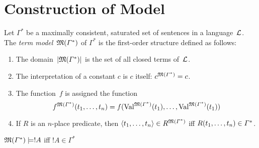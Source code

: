\documentclass[open-logic-section]{subfiles}
\begin{document}
\section{Construction of Model}

\begin{defn}
Let $\Gamma^*$ be a maximally consistent, saturated set of sentences
in a language~$\mathcal L$.  The \emph{term model}~$\mathfrak M(\Gamma^*)$
of $\Gamma^*$ is the first-order structure defined as follows:
\begin{enumerate}
\item The domain~$\left| \mathfrak M(\Gamma^*) \right|$ is the set of all closed terms
  of~$\mathcal L$.
\item The interpretation of a constant $c$ is $c$ itself:
  $c^{\mathfrak M(\Gamma^*)} = c$.
\item The function~$f$ is assigned the function
\[
\Assign{f}{M(\Gamma^*)}(t_1, \dots, t_n) = f(\Value{t_1}{M(\Gamma^*)},
\dots, \Value{t_1}{M(\Gamma^*)})
\]
\item If $R$ is an $n$-place predicate, then $\langle t_1, \dots,
  t_n\rangle \in R^{\mathfrak M(\Gamma^*)}$ iff ${ R(t_1, \dots,
    t_n) } \in \Gamma^*$.
\end{enumerate}
\end{defn}

\begin{thm}
$\Sat{M(\Gamma^*)}{!A}$ iff $!A \in \Gamma^*$
\end{thm}

\end{document}
